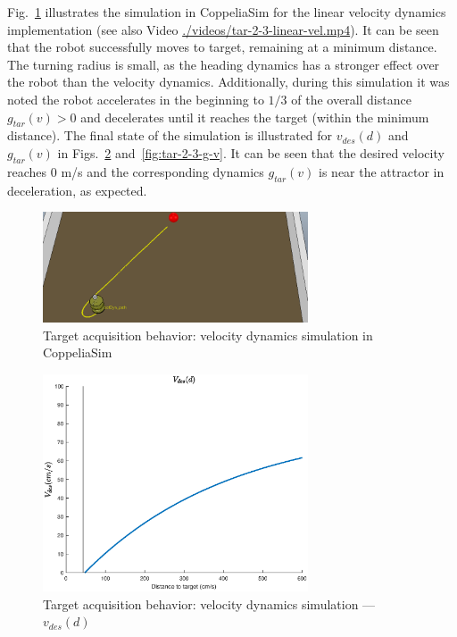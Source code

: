 Fig.~\ref{fig:tar-linear-vel-arena} illustrates the simulation in CoppeliaSim
for the linear velocity dynamics implementation (see also Video
\href{run:./videos/tar-2-3-linear-vel.mp4}{./videos/tar-2-3-linear-vel.mp4}). It can be seen that the robot
successfully moves to target, remaining at a minimum distance. The turning
radius is small, as the heading dynamics has a stronger effect over the robot
than the velocity dynamics. Additionally, during this simulation it was noted
the robot accelerates in the beginning to $1/3$ of the overall distance
$g_{tar}(v) > 0$ and decelerates until it reaches the target (within the minimum
distance). The final state of the simulation is illustrated for $v_{des}(d)$ and
$g_{tar}(v)$ in Figs.~\ref{fig:tar-2-3-vdes} and~\ref{fig:tar-2-3-g-v}. It can
be seen that the desired velocity reaches $0$ m/s and the corresponding dynamics
$g_{tar}(v)$ is near the attractor in deceleration, as expected.
%
\begin{figure}[!hbt]
\centering
    \includegraphics[width=0.7\textwidth]{./img/tar-2-3-arena.png}
  \caption{Target acquisition behavior: velocity dynamics simulation in CoppeliaSim}%
\label{fig:tar-linear-vel-arena}
\end{figure}
%
\begin{figure}[!hbt]
\centering
    \includegraphics[width=0.7\textwidth]{./img/2-3-vdes.eps}
    \caption{Target acquisition behavior: velocity dynamics simulation ---
      $v_{des} (d)$}%
\label{fig:tar-2-3-vdes}
\end{figure}
